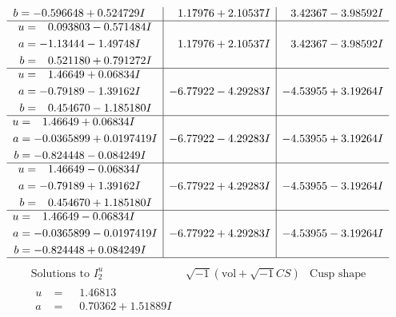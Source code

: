 \documentclass[1p]{elsarticle_modified}
\theoremstyle{definition}
\newcommand{\I}{\sqrt{-1}}
\begin{document}
$$\begin{array}{c|c|c}
\begin{aligned}
b &= -0.596648 + 0.524729 I\end{aligned}
 & \phantom{-}1.17976 + 2.10537 I & \phantom{-}3.42367 - 3.98592 I \\ \hline\begin{aligned}
u &= \phantom{-}0.093803 - 0.571484 I \\
a &= -1.13444 - 1.49748 I \\
b &= \phantom{-}0.521180 + 0.791272 I\end{aligned}
 & \phantom{-}1.17976 + 2.10537 I & \phantom{-}3.42367 - 3.98592 I \\ \hline\begin{aligned}
u &= \phantom{-}1.46649 + 0.06834 I \\
a &= -0.79189 - 1.39162 I \\
b &= \phantom{-}0.454670 - 1.185180 I\end{aligned}
 & -6.77922 - 4.29283 I & -4.53955 + 3.19264 I \\ \hline\begin{aligned}
u &= \phantom{-}1.46649 + 0.06834 I \\
a &= -0.0365899 + 0.0197419 I \\
b &= -0.824448 - 0.084249 I\end{aligned}
 & -6.77922 - 4.29283 I & -4.53955 + 3.19264 I \\ \hline\begin{aligned}
u &= \phantom{-}1.46649 - 0.06834 I \\
a &= -0.79189 + 1.39162 I \\
b &= \phantom{-}0.454670 + 1.185180 I\end{aligned}
 & -6.77922 + 4.29283 I & -4.53955 - 3.19264 I \\ \hline\begin{aligned}
u &= \phantom{-}1.46649 - 0.06834 I \\
a &= -0.0365899 - 0.0197419 I \\
b &= -0.824448 + 0.084249 I\end{aligned}
 & -6.77922 + 4.29283 I & -4.53955 - 3.19264 I\\
 \hline 
 \end{array}$$\newpage$$\begin{array}{c|c|c}  
\text{Solutions to }I^u_{2}& \I (\text{vol} + \sqrt{-1}CS) & \text{Cusp shape}\\
 \hline 
\begin{aligned}
u &= \phantom{-}1.46813\phantom{ +0.000000I} \\
a &= \phantom{-}0.70362 + 1.51889 I \\

\end{aligned}
\end{array}$$
\end{document}
